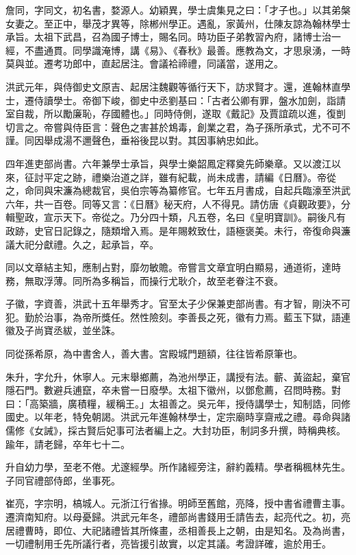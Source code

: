 \begin{pinyinscope}
詹同，字同文，初名書，婺源人。幼穎異，學士虞集見之曰：「才子也。」以其弟槃女妻之。至正中，舉茂才異等，除郴州學正。遇亂，家黃州，仕陳友諒為翰林學士承旨。太祖下武昌，召為國子博士，賜名同。時功臣子弟教習內府，諸博士治一經，不盡通貫。同學識淹博，講《易》、《春秋》最善。應教為文，才思泉湧，一時莫與並。遷考功郎中，直起居注。會議袷禘禮，同議當，遂用之。

洪武元年，與侍御史文原吉、起居注魏觀等循行天下，訪求賢才。還，進翰林直學士，遷侍讀學士。帝御下峻，御史中丞劉基曰：「古者公卿有罪，盤水加劍，詣請室自裁，所以勵廉恥，存國體也。」同時侍側，遂取《戴記》及賈誼疏以進，復剴切言之。帝嘗與侍臣言：聲色之害甚於鴆毒，創業之君，為子孫所承式，尤不可不謹。同因舉成湯不邇聲色，垂裕後昆以對。其因事納忠如此。

四年進吏部尚書。六年兼學士承旨，與學士樂韶鳳定釋奠先師樂章。又以渡江以來，征討平定之跡，禮樂治道之詳，雖有紀載，尚未成書，請編《日曆》。帝從之，命同與宋濂為總裁官，吳伯宗等為纂修官。七年五月書成，自起兵臨濠至洪武六年，共一百卷。同等又言：《日曆》秘天府，人不得見。請仿唐《貞觀政要》，分輯聖政，宣示天下。帝從之。乃分四十類，凡五卷，名曰《皇明寶訓》。嗣後凡有政跡，史官日記錄之，隨類增入焉。是年賜敕致仕，語極褒美。未行，帝復命與濂議大祀分獻禮。久之，起承旨，卒。

同以文章結主知，應制占對，靡勿敏贍。帝嘗言文章宜明白顯易，通道術，達時務，無取浮薄。同所為多稱旨，而操行尤耿介，故至老眷注不衰。

子徽，字資善，洪武十五年舉秀才。官至太子少保兼吏部尚書。有才智，剛決不可犯。勤於治事，為帝所獎任。然性險刻。李善長之死，徽有力焉。藍玉下獄，語連徽及子尚寶丞紱，並坐誅。

同從孫希原，為中書舍人，善大書。宮殿城門題額，往往皆希原筆也。

朱升，字允升，休寧人。元末舉鄉薦，為池州學正，講授有法。蘄、黃盜起，棄官隱石門。數避兵逋竄，卒未嘗一日廢學。太祖下徽州，以鄧愈薦，召問時務。對曰：「高築牆，廣積糧，緩稱王。」太祖善之。吳元年，授侍講學士，知制誥，同修國史。以年老，特免朝謁。洪武元年進翰林學士，定宗廟時享齋戒之禮。尋命與諸儒修《女誡》，採古賢后妃事可法者編上之。大封功臣，制詞多升撰，時稱典核。踰年，請老歸，卒年七十二。

升自幼力學，至老不倦。尤邃經學。所作諸經旁注，辭約義精。學者稱楓林先生。子同官禮部侍郎，坐事死。

崔亮，字宗明，槁城人。元浙江行省掾。明師至舊館，亮降，授中書省禮曹主事。遷濟南知府。以母憂歸。洪武元年冬，禮部尚書錢用壬請告去，起亮代之。初，亮居禮曹時，即位、大祀諸禮皆其所條畫，丞相善長上之朝，由是知名。及為尚書，一切禮制用壬先所議行者，亮皆援引故實，以定其議。考證詳確，逾於用壬。


\end{pinyinscope}
